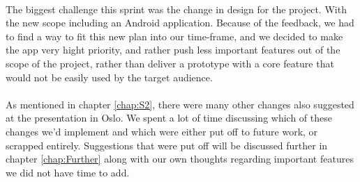 \paragraph{} The biggest challenge this sprint was the change in design for the project. With the new scope including an Android application. Because of the feedback, we had to find a way to fit this new plan into our time-frame, and we decided to make the app very hight priority, and rather push less important features out of the scope of the project, rather than deliver a prototype with a core feature that would not be easily used by the target audience.

\paragraph{} As mentioned in chapter \ref{chap:S2}, there were many other changes also suggested at the presentation in Oslo. We spent a lot of time discussing which of these changes we'd implement and which were either put off to future work, or scrapped entirely. Suggestions that were put off will be discussed further in chapter \ref{chap:Further} along with our own thoughts regarding important features we did not have time to add. 

